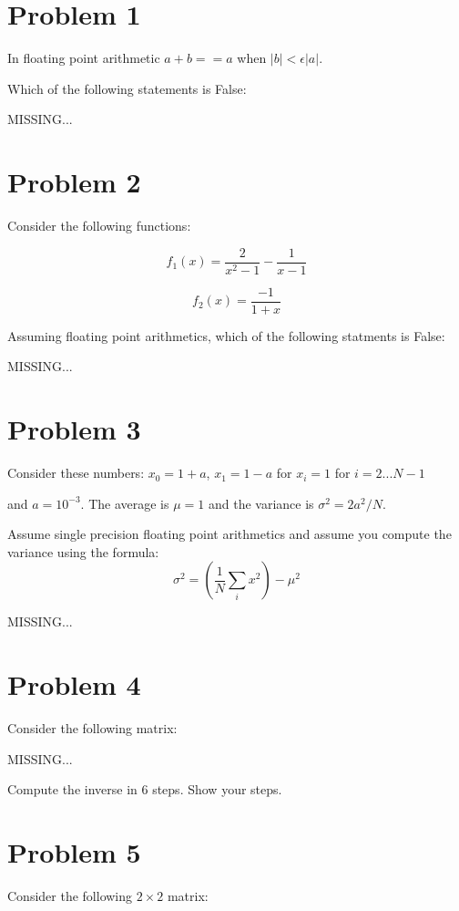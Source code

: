 \documentclass[12pt]{article}
\begin{document}
\section{Problem 1}

\noindent In floating point arithmetic $a+b==a$ when $|b|<\epsilon |a|$. 

\noindent Which of the following statements is False:

MISSING...

\section{Problem 2}

\noindent Consider the following functions:

\[
f_1(x) = \frac2{x^2-1} - \frac1{x-1}
\]

\[
f_2(x) = \frac{-1}{1+x}
\]

\noindent Assuming floating point arithmetics, which of the following statments is False:

MISSING...

\section{Problem 3}

\noindent Consider these numbers:
$x_0 = 1+a$, $x_1 = 1-a$ for $x_i=1$ for $i = 2...N-1$

\noindent and $a=10^{-3}$. The average is $\mu = 1$ and the variance is $\sigma^2 = 2 a^2/N$.

\noindent Assume single precision floating point arithmetics and assume you compute the variance using the formula:
\[
\sigma^2 = (\frac1N \sum_i x^2) - \mu^2
\]

MISSING...

\section{Problem 4}

\noindent Consider the following matrix:

MISSING...

\noindent Compute the inverse in 6 steps. Show your steps.

\section{Problem 5}

\noindent Consider the following $2 \times 2$ matrix:
\end{document}
